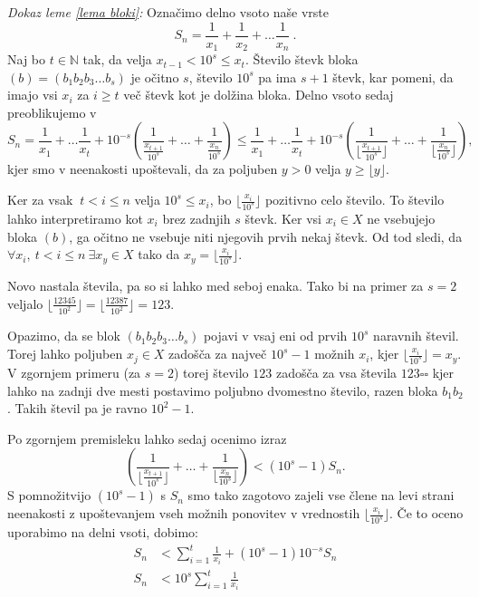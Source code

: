 \documentclass[a4paper,12pt]{article}
\def\N{\mathbb{N}} %
\begin{document}
\noindent
{\em Dokaz leme \ref{lema bloki}:\/} 
Označimo delno vsoto naše vrste 
\[ S_n = \frac{1}{x_1} + \frac{1}{x_2} + \dots \frac{1}{x_n} \ . \]
Naj bo $t \in \N $ tak, da velja $x_{t-1} < 10^s \leq x_t$. Število števk bloka $(b) = (b_1b_2b_3 \dots b_s)$
je očitno $s$, število $10^s$ pa ima $s+1$ števk, kar pomeni, da imajo vsi $x_i$ za $i \geq t$
več števk kot je dolžina bloka. Delno vsoto sedaj preoblikujemo v
\[ S_n = \frac{1}{x_1} + \dots \frac{1}{x_t} + 10^{-s}(\frac{1}{\frac{x_{t + 1}}{10^s}} + \dots + \frac{1}{\frac{x_n}{10^s}})
    \leq \frac{1}{x_1} + \dots \frac{1}{x_t} + 10^{-s}(\frac{1}{ \lfloor\frac{x_{t + 1}}{10^s}\rfloor} + \dots + \frac{1}{\lfloor\frac{x_n}{10^s}\rfloor}) ,
\]
kjer smo v neenakosti upoštevali, da za poljuben $y > 0$ velja $y \geq \lfloor y \rfloor$.

Ker za vsak $\ t < i \leq n$ velja $10^s \leq x_i$, bo $\lfloor \frac{x_i}{10^s} \rfloor$ pozitivno celo število.
To število lahko interpretiramo kot $x_i$ brez zadnjih $s$ števk. Ker vsi $x_i \in X$
ne vsebujejo bloka $(b)$, ga očitno ne vsebuje niti njegovih prvih nekaj števk. Od tod sledi, da 
$ \forall x_i, \ t < i \leq n \ \exists x_y \in X$ tako da $ x_y = \lfloor \frac{x_i}{10^s} \rfloor$.

Novo nastala števila, pa so si lahko med seboj enaka. Tako bi na primer za $s=2$ veljalo 
$ \lfloor\frac{12345}{10^2}\rfloor = \lfloor \frac{12387}{10^2}\rfloor = 123$.

Opazimo, da se blok $(b_1b_2b_3 \dots b_s)$ pojavi v vsaj eni od prvih $10^s$ naravnih števil.
Torej lahko poljuben $x_j \in X$ zadošča za največ $10^s - 1$ možnih $x_i$, kjer $\lfloor \frac{x_i}{10^s} \rfloor = x_y$.
V zgornjem primeru (za $s=2$) torej število $123$ zadošča za vsa števila $123 \square \square$
kjer lahko na zadnji dve mesti postavimo poljubno dvomestno število, razen bloka $b_1b_2$.
Takih števil pa je ravno $10^2 - 1$.

Po zgornjem premisleku lahko sedaj ocenimo izraz 
\[(\frac{1}{ \lfloor\frac{x_{t + 1}}{10^s}\rfloor} + \dots + \frac{1}{\lfloor\frac{x_n}{10^s}\rfloor}) < (10^s - 1)S_n.\]
S pomnožitvijo $(10^s - 1)$ s $S_n$ smo tako zagotovo zajeli vse člene na levi strani neenakosti
z upoštevanjem vseh možnih ponovitev v vrednostih $\lfloor\frac{x_i}{10^s}\rfloor$.
Če to oceno uporabimo na delni vsoti, dobimo:
\[
    \begin{split}
    S_n &< \sum_{i=1}^t \frac{1}{x_i} + (10^s - 1)10^{-s}S_n \\
    S_n &< 10^s \sum_{i=1}^t \frac{1}{x_i}
    \end{split}
    \]
\end{document}
